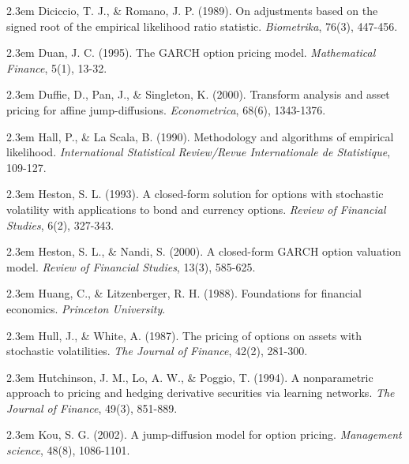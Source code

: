 \documentclass[oneside,english]{amsbook}
\numberwithin{section}{chapter}
\numberwithin{equation}{section}
\numberwithin{figure}{section}
\theoremstyle{plain}
\theoremstyle{plain}
\theoremstyle{definition}
\theoremstyle{plain}
\theoremstyle{plain}
\theoremstyle{remark}
\theoremstyle{definition}
\theoremstyle{definition}
\begin{document}
\par\noindent\hangindent2.3em
Diciccio, T. J., \& Romano, J. P. (1989). On adjustments based on the signed root of the empirical likelihood ratio statistic. {\em Biometrika}, 76(3), 447-456.

\par\noindent\hangindent2.3em
Duan, J. C. (1995). The GARCH option pricing model. {\em Mathematical Finance}, 5(1), 13-32.

\par\noindent\hangindent2.3em
Duffie, D., Pan, J., \& Singleton, K. (2000). Transform analysis and asset pricing for affine jump-diffusions. {\em Econometrica}, 68(6), 1343-1376.

\par\noindent\hangindent2.3em
Hall, P., \& La Scala, B. (1990). Methodology and algorithms of empirical likelihood. {\em International Statistical Review/Revue Internationale de Statistique}, 109-127.

\par\noindent\hangindent2.3em
Heston, S. L. (1993). A closed-form solution for options with stochastic volatility with applications to bond and currency options. {\em Review of Financial Studies}, 6(2), 327-343.

\par\noindent\hangindent2.3em
Heston, S. L., \& Nandi, S. (2000). A closed-form GARCH option valuation model. {\em Review of Financial Studies}, 13(3), 585-625.

\par\noindent\hangindent2.3em
Huang, C., \& Litzenberger, R. H. (1988). Foundations for financial economics. {\em Princeton University}.

\par\noindent\hangindent2.3em
Hull, J., \& White, A. (1987). The pricing of options on assets with stochastic volatilities. {\em The Journal of Finance}, 42(2), 281-300.

\par\noindent\hangindent2.3em
Hutchinson, J. M., Lo, A. W., \& Poggio, T. (1994). A nonparametric approach to pricing and hedging derivative securities via learning networks. {\em The Journal of Finance}, 49(3), 851-889.

\par\noindent\hangindent2.3em
Kou, S. G. (2002). A jump-diffusion model for option pricing. {\em Management science}, 48(8), 1086-1101.
\end{document}
